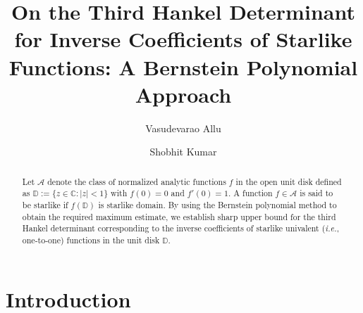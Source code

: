 \documentclass[a4paper,12pt,reqno]{amsart}
\numberwithin{equation}{section}
\begin{document}
	
	\title{On the Third Hankel Determinant for Inverse Coefficients of Starlike Functions: A Bernstein Polynomial Approach}
	\author{Vasudevarao Allu}
	\address{Vasudevarao Allu, Department of Mathematics, School of Basic Sciences,
		Indian Institute of Technology Bhubaneswar, Jatni Road, Argul,
		Bhubaneswar 752050, Odisha, India}
	
	\author{Shobhit Kumar}
	\address{Shobhit Kumar, Department of Mathematics, School of Basic Sciences,
		Indian Institute of Technology Bhubaneswar, Jatni Road, Argul,
		Bhubaneswar 752050, Odisha, India}
	\date{}
	\begin{abstract}
		Let $\mathcal{A}$ denote the class of normalized analytic functions $f$ in the open unit disk defined as
		$
		\mathbb{D}:=\{z\in\mathbb{C}:|z|<1\}
		$
		with $f(0)=0$ and $f'(0)=1$. A function $f\in\mathcal{A}$ is said to be starlike if $f(\mathbb{D})$ is starlike domain. By using  the Bernstein polynomial method to obtain the required maximum estimate, we establish  sharp upper bound for the third Hankel determinant corresponding to the inverse coefficients of starlike univalent ({\it i.e.}, one-to-one) functions in the unit disk $\mathbb{D}$. 
	\end{abstract}
	\maketitle
	
\section{Introduction}
\end{document}
